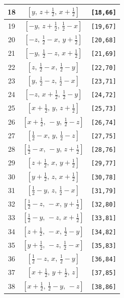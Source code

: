 \documentclass[fleqn,8pt]{jsarticle}
\begin{document}
\begin{longtable}{ccc}
18 & $\left[ y,\, z + \frac{1}{2},\, x + \frac{1}{2} \right]$ & {\tt [18,66]} \\ \hline
19 & $\left[ - y,\, z + \frac{1}{2},\, \frac{1}{2} - x \right]$ & {\tt [19,67]} \\ \hline
20 & $\left[ - z,\, \frac{1}{2} - x,\, y + \frac{1}{2} \right]$ & {\tt [20,68]} \\ \hline
21 & $\left[ - y,\, \frac{1}{2} - z,\, x + \frac{1}{2} \right]$ & {\tt [21,69]} \\ \hline
22 & $\left[ z,\, \frac{1}{2} - x,\, \frac{1}{2} - y \right]$ & {\tt [22,70]} \\ \hline
23 & $\left[ y,\, \frac{1}{2} - z,\, \frac{1}{2} - x \right]$ & {\tt [23,71]} \\ \hline
24 & $\left[ - z,\, x + \frac{1}{2},\, \frac{1}{2} - y \right]$ & {\tt [24,72]} \\ \hline
25 & $\left[ x + \frac{1}{2},\, y,\, z + \frac{1}{2} \right]$ & {\tt [25,73]} \\ \hline
26 & $\left[ x + \frac{1}{2},\, - y,\, \frac{1}{2} - z \right]$ & {\tt [26,74]} \\ \hline
27 & $\left[ \frac{1}{2} - x,\, y,\, \frac{1}{2} - z \right]$ & {\tt [27,75]} \\ \hline
28 & $\left[ \frac{1}{2} - x,\, - y,\, z + \frac{1}{2} \right]$ & {\tt [28,76]} \\ \hline
29 & $\left[ z + \frac{1}{2},\, x,\, y + \frac{1}{2} \right]$ & {\tt [29,77]} \\ \hline
30 & $\left[ y + \frac{1}{2},\, z,\, x + \frac{1}{2} \right]$ & {\tt [30,78]} \\ \hline
31 & $\left[ \frac{1}{2} - y,\, z,\, \frac{1}{2} - x \right]$ & {\tt [31,79]} \\ \hline
32 & $\left[ \frac{1}{2} - z,\, - x,\, y + \frac{1}{2} \right]$ & {\tt [32,80]} \\ \hline
33 & $\left[ \frac{1}{2} - y,\, - z,\, x + \frac{1}{2} \right]$ & {\tt [33,81]} \\ \hline
34 & $\left[ z + \frac{1}{2},\, - x,\, \frac{1}{2} - y \right]$ & {\tt [34,82]} \\ \hline
35 & $\left[ y + \frac{1}{2},\, - z,\, \frac{1}{2} - x \right]$ & {\tt [35,83]} \\ \hline
36 & $\left[ \frac{1}{2} - z,\, x,\, \frac{1}{2} - y \right]$ & {\tt [36,84]} \\ \hline
37 & $\left[ x + \frac{1}{2},\, y + \frac{1}{2},\, z \right]$ & {\tt [37,85]} \\ \hline
38 & $\left[ x + \frac{1}{2},\, \frac{1}{2} - y,\, - z \right]$ & {\tt [38,86]} \\ \hline

\end{longtable}
\end{document}
